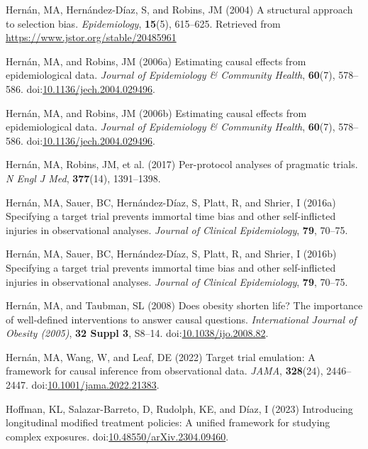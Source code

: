 \documentclass[
  single column]{article}
\newlength{\cslhangindent}
\newenvironment{CSLReferences}[2] %
 {\begin{list}{}{%
  \setlength{\itemindent}{0pt}
  \setlength{\leftmargin}{0pt}
  \setlength{\parsep}{0pt}
  \ifodd #1
   \setlength{\leftmargin}{\cslhangindent}
   \setlength{\itemindent}{-1\cslhangindent}
  \fi
  \setlength{\itemsep}{#2\baselineskip}}}
 {\end{list}}
\begin{document}
\begin{CSLReferences}{1}{0}
Hernán, MA, Hernández-Díaz, S, and Robins, JM (2004) A structural
approach to selection bias. \emph{Epidemiology}, \textbf{15}(5),
615--625. Retrieved from \url{https://www.jstor.org/stable/20485961}

Hernán, MA, and Robins, JM (2006a) Estimating causal effects from
epidemiological data. \emph{Journal of Epidemiology \& Community
Health}, \textbf{60}(7), 578--586.
doi:\href{https://doi.org/10.1136/jech.2004.029496}{10.1136/jech.2004.029496}.

Hernán, MA, and Robins, JM (2006b) Estimating causal effects from
epidemiological data. \emph{Journal of Epidemiology \& Community
Health}, \textbf{60}(7), 578--586.
doi:\href{https://doi.org/10.1136/jech.2004.029496}{10.1136/jech.2004.029496}.

Hernán, MA, Robins, JM, et al. (2017) Per-protocol analyses of pragmatic
trials. \emph{N Engl J Med}, \textbf{377}(14), 1391--1398.

Hernán, MA, Sauer, BC, Hernández-Díaz, S, Platt, R, and Shrier, I
(2016a) Specifying a target trial prevents immortal time bias and other
self-inflicted injuries in observational analyses. \emph{Journal of
Clinical Epidemiology}, \textbf{79}, 70--75.

Hernán, MA, Sauer, BC, Hernández-Díaz, S, Platt, R, and Shrier, I
(2016b) Specifying a target trial prevents immortal time bias and other
self-inflicted injuries in observational analyses. \emph{Journal of
Clinical Epidemiology}, \textbf{79}, 70--75.

Hernán, MA, and Taubman, SL (2008) Does obesity shorten life? The
importance of well-defined interventions to answer causal questions.
\emph{International Journal of Obesity (2005)}, \textbf{32 Suppl 3},
S8--14.
doi:\href{https://doi.org/10.1038/ijo.2008.82}{10.1038/ijo.2008.82}.

Hernán, MA, Wang, W, and Leaf, DE (2022) Target trial emulation: A
framework for causal inference from observational data. \emph{JAMA},
\textbf{328}(24), 2446--2447.
doi:\href{https://doi.org/10.1001/jama.2022.21383}{10.1001/jama.2022.21383}.

Hoffman, KL, Salazar-Barreto, D, Rudolph, KE, and Díaz, I (2023)
Introducing longitudinal modified treatment policies: A unified
framework for studying complex exposures.
doi:\href{https://doi.org/10.48550/arXiv.2304.09460}{10.48550/arXiv.2304.09460}.


\end{CSLReferences}
\end{document}
